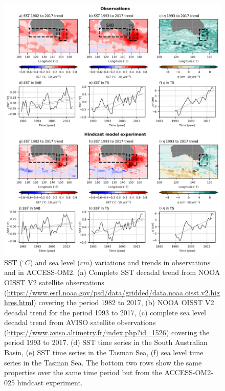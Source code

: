 \documentclass[draft,linenumbers]{agujournal2018}
\begin{document}
\begin{figure}[h]
\centering
\includegraphics[trim={0 0 0 0},clip,width=1\textwidth]{p01_c10.png}
\caption{SST ($^{\circ}C$) and sea level ($cm$) variations and trends in observations and in ACCESS-OM2. (a) Complete SST decadal trend from NOOA OISST V2 satellite observations (\url{https://www.esrl.noaa.gov/psd/data/gridded/data.noaa.oisst.v2.highres.html}) covering the period 1982 to 2017, (b) NOOA OISST V2 decadal trend for the period 1993 to 2017, (c) complete sea level decadal trend from AVISO satellite observations (\url{https://www.aviso.altimetry.fr/index.php?id=1526}) covering the period 1993 to 2017. (d) SST time series in the South Australian Basin, (e) SST time series in the Tasman Sea, (f) sea level time series in the Tasman Sea. The bottom two rows show the same properties over the same time period but from the ACCESS-OM2-025 hindcast experiment.}\label{p01_c10}
\end{figure}
\end{document}

